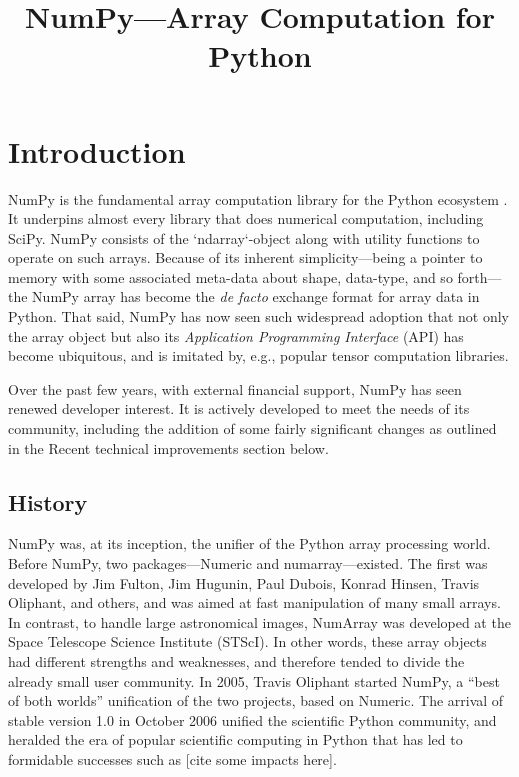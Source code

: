 \documentclass[fleqn,10pt]{wlscirep}
\title{NumPy---Array Computation for Python}
\begin{document}
\flushbottom
\maketitle
\thispagestyle{empty}

\section*{Introduction}

NumPy is the fundamental array computation library for the Python
ecosystem \cite{dubois2007guest,oliphant2007python,millman2011python,perez2011python}.
It underpins almost every library that does numerical
computation, including SciPy.  NumPy consists of the `ndarray`-object
along with utility functions to operate on such arrays.  Because of
its inherent simplicity—being a pointer to memory with some
associated meta-data about shape, data-type, and so forth—the NumPy
array has become the {\it de facto} exchange format for array data in
Python.  That said, NumPy has now seen such widespread adoption that
not only the array object but also its {\it Application Programming
  Interface} (API) has become ubiquitous, and is imitated by, e.g.,
popular tensor computation libraries.

Over the past few years, with external financial support, NumPy has
seen renewed developer interest.  It is actively developed to meet the
needs of its community, including the addition of some fairly significant
changes as outlined in the Recent technical improvements section below.

\subsection*{History}

NumPy was, at its inception, the unifier of the Python array
processing world.  Before NumPy, two packages—Numeric and
numarray—existed.  The first was developed by Jim Fulton, Jim Hugunin, Paul Dubois, Konrad
Hinsen, Travis Oliphant, and others, and was aimed at fast manipulation of many
small arrays.  In contrast, to handle large astronomical images,
NumArray was developed at the Space Telescope Science Institute (STScI).
In other words, these array
objects had different strengths and weaknesses, and therefore tended
to divide the already small user community.  In 2005, Travis Oliphant
started NumPy, a ``best of both worlds'' unification of the two
projects, based on Numeric.  The arrival of stable version 1.0 in October
2006 unified the scientific Python
community, and heralded the era of popular scientific computing in
Python that has led to formidable successes such as [cite some impacts here].
\end{document}
